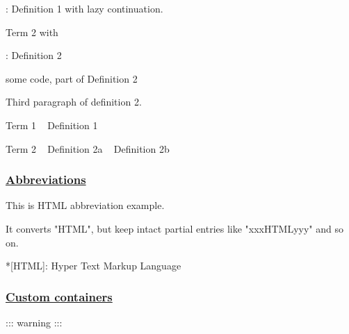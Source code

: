 \documentclass{article}
\begin{document}
:   Definition 1
with lazy continuation.

Term 2 with 

:   Definition 2

    { some code, part of Definition 2 }

Third paragraph of definition 2.



Term 1
~ Definition 1

Term 2
~ Definition 2a
~ Definition 2b



\subsubsection{\href{https://github.com/markdown-it/markdown-it-abbr}{Abbreviations}}

This is HTML abbreviation example.

It converts "HTML", but keep intact partial entries like "xxxHTMLyyy" and so on.

*[HTML]: Hyper Text Markup Language

\subsubsection{\href{https://github.com/markdown-it/markdown-it-container}{Custom containers}}

::: warning
:::
\end{document}

